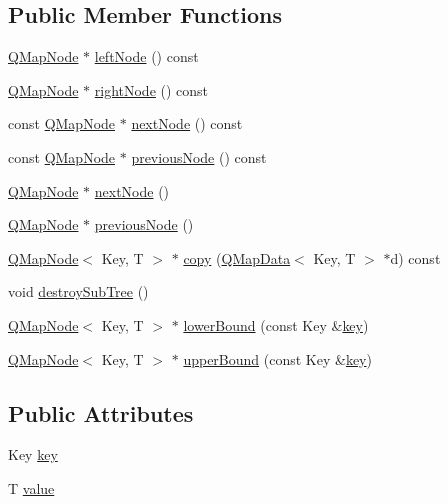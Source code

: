 \subsection*{Public Member Functions}
\begin{DoxyCompactItemize}
\item 
\hyperlink{struct_q_map_node}{Q\+Map\+Node} $\ast$ \hyperlink{struct_q_map_node_a9bac36e9a52f89639bd2fa7f4839650d}{left\+Node} () const 
\item 
\hyperlink{struct_q_map_node}{Q\+Map\+Node} $\ast$ \hyperlink{struct_q_map_node_a94e6d3149e83ad24beaaf45cc16e800c}{right\+Node} () const 
\item 
const \hyperlink{struct_q_map_node}{Q\+Map\+Node} $\ast$ \hyperlink{struct_q_map_node_ae2b84505a38a7bd58e843021eceb679d}{next\+Node} () const 
\item 
const \hyperlink{struct_q_map_node}{Q\+Map\+Node} $\ast$ \hyperlink{struct_q_map_node_a8998806963e7a7180fbb021503c0e5c5}{previous\+Node} () const 
\item 
\hyperlink{struct_q_map_node}{Q\+Map\+Node} $\ast$ \hyperlink{struct_q_map_node_a63314461289c232d3d8b813b3431a95d}{next\+Node} ()
\item 
\hyperlink{struct_q_map_node}{Q\+Map\+Node} $\ast$ \hyperlink{struct_q_map_node_ac76d623654ec393538172c95e4d7f4f9}{previous\+Node} ()
\item 
\hyperlink{struct_q_map_node}{Q\+Map\+Node}$<$ Key, T $>$ $\ast$ \hyperlink{struct_q_map_node_af28a6a3ca05bb30fa33defd63d7bb237}{copy} (\hyperlink{struct_q_map_data}{Q\+Map\+Data}$<$ Key, T $>$ $\ast$d) const 
\item 
void \hyperlink{struct_q_map_node_a4dcf5b5c4bb4d8df0805abf6de104dea}{destroy\+Sub\+Tree} ()
\item 
\hyperlink{struct_q_map_node}{Q\+Map\+Node}$<$ Key, T $>$ $\ast$ \hyperlink{struct_q_map_node_a54614b1c04773d2380382fe0dcee38e7}{lower\+Bound} (const Key \&\hyperlink{struct_q_map_node_a6300e95158f21d89fcd4059fb75fb3d6}{key})
\item 
\hyperlink{struct_q_map_node}{Q\+Map\+Node}$<$ Key, T $>$ $\ast$ \hyperlink{struct_q_map_node_ad80318241539f08d081275f1a757cff3}{upper\+Bound} (const Key \&\hyperlink{struct_q_map_node_a6300e95158f21d89fcd4059fb75fb3d6}{key})
\end{DoxyCompactItemize}
\subsection*{Public Attributes}
\begin{DoxyCompactItemize}
\item 
Key \hyperlink{struct_q_map_node_a6300e95158f21d89fcd4059fb75fb3d6}{key}
\item 
T \hyperlink{struct_q_map_node_a872bc4a284250baed9e3dc22b8e39692}{value}
\end{DoxyCompactItemize}
